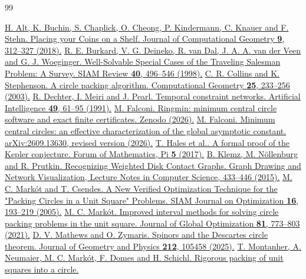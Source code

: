 \begin{thebibliography}{99}
\small\raggedright
\setlength{\itemsep}{1pt}
\href{https://doi.org/10.20382/jocg.v9i1a10}{H. Alt, K. Buchin, S. Chaplick, O. Cheong, P. Kindermann, C. Knauer and F. Stehn. Placing your Coins on a Shelf.
Journal of Computational Geometry \textbf{9}, 312--327 (2018).}
\href{https://doi.org/10.1137/s0036144596297514}{R. E. Burkard, V. G. Deineko, R. van Dal, J. A. A. van der Veen and G. J. Woeginger. Well-Solvable Special Cases of the Traveling Salesman Problem: A Survey.
SIAM Review \textbf{40}, 496--546 (1998).}
\href{https://doi.org/10.1016/s0925-7721(02)00099-8}{C. R. Collins and K. Stephenson. A circle packing algorithm.
Computational Geometry \textbf{25}, 233--256 (2003).}
\href{https://doi.org/10.1016/0004-3702(91)90006-6}{R. Dechter, I. Meiri and J. Pearl. Temporal constraint networks.
Artificial Intelligence \textbf{49}, 61--95 (1991).}
\href{https://doi.org/10.5281/zenodo.22849826}{M. Falconi. Ringmin: minimum central circle software and exact finite certificates.
Zenodo (2026).}
\href{https://doi.org/10.48550/arXiv.2609.13630}{M. Falconi. Minimum central circles: an effective characterization of the global asymptotic constant.
arXiv:2609.13630, revised version (2026).}
\href{https://doi.org/10.1017/fmp.2017.1}{T. Hales et al.. A formal proof of the Kepler conjecture.
Forum of Mathematics, Pi \textbf{5} (2017).}
\href{https://doi.org/10.1007/978-3-319-27261-0_36}{B. Klemz, M. Nöllenburg and R. Prutkin. Recognizing Weighted Disk Contact Graphs.
Graph Drawing and Network Visualization, Lecture Notes in Computer Science, 433--446 (2015).}
\href{https://doi.org/10.1137/s1052623403425617}{M. C. Markót and T. Csendes. A New Verified Optimization Technique for the "Packing Circles in a Unit Square" Problems.
SIAM Journal on Optimization \textbf{16}, 193--219 (2005).}
\href{https://doi.org/10.1007/s10898-021-01086-z}{M. C. Markót. Improved interval methods for solving circle packing problems in the unit square.
Journal of Global Optimization \textbf{81}, 773--803 (2021).}
\href{https://doi.org/10.1016/j.geomphys.2025.105458}{D. V. Mathews and O. Zymaris. Spinors and the Descartes circle theorem.
Journal of Geometry and Physics \textbf{212}, 105458 (2025).}
\href{https://doi.org/10.1007/s10898-018-0711-5}{T. Montanher, A. Neumaier, M. C. Markót, F. Domes and H. Schichl. Rigorous packing of unit squares into a circle.
}
\end{thebibliography}
